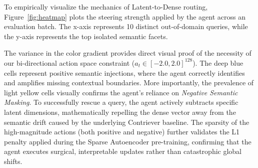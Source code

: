 To empirically visualize the mechanics of Latent-to-Dense routing, Figure~\ref{fig:heatmap} plots the steering strength applied by the agent across an evaluation batch. The x-axis represents 10 distinct out-of-domain queries, while the y-axis represents the top isolated semantic facets.

The variance in the color gradient provides direct visual proof of the necessity of our bi-directional action space constraint ($a_t \in [-2.0, 2.0]^{128}$). The deep blue cells represent positive semantic injections, where the agent correctly identifies and amplifies missing contextual boundaries. More importantly, the prevalence of light yellow cells visually confirms the agent's reliance on \textit{Negative Semantic Masking}. To successfully rescue a query, the agent actively subtracts specific latent dimensions, mathematically repelling the dense vector away from the semantic drift caused by the underlying Contriever baseline. The sparsity of the high-magnitude actions (both positive and negative) further validates the L1 penalty applied during the Sparse Autoencoder pre-training, confirming that the agent executes surgical, interpretable updates rather than catastrophic global shifts.

\begin{table}[htbp]
  \caption{Zero-Shot Retrieval Performance. Performance metrics (NDCG@10) evaluated exclusively on the randomly split, 50\% held-out query sets across five BEIR datasets. Bold values indicate the highest performing model in each column.}
  \begin{center}
  \end{center}
  \label{tab:retrieval_performance}
\end{table}

